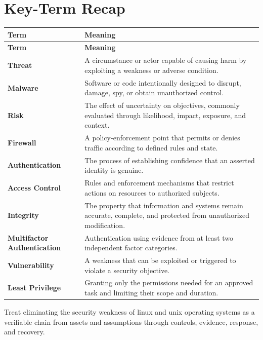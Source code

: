 \documentclass[11pt]{article}
\begin{document}
\section*{Key-Term Recap}
\begin{longtable}{>{\RaggedRight\arraybackslash}p{}>{\RaggedRight\arraybackslash}p{}}
\toprule\rowcolor{Navy}\color{white}\textbf{Term} & \color{white}\textbf{Meaning}\\\midrule
\endfirsthead
\toprule\rowcolor{Navy}\color{white}\textbf{Term} & \color{white}\textbf{Meaning}\\\midrule
\endhead
\textbf{Threat} & A circumstance or actor capable of causing harm by exploiting a weakness or adverse condition. \\\midrule
\textbf{Malware} & Software or code intentionally designed to disrupt, damage, spy, or obtain unauthorized control. \\\midrule
\textbf{Risk} & The effect of uncertainty on objectives, commonly evaluated through likelihood, impact, exposure, and context. \\\midrule
\textbf{Firewall} & A policy-enforcement point that permits or denies traffic according to defined rules and state. \\\midrule
\textbf{Authentication} & The process of establishing confidence that an asserted identity is genuine. \\\midrule
\textbf{Access Control} & Rules and enforcement mechanisms that restrict actions on resources to authorized subjects. \\\midrule
\textbf{Integrity} & The property that information and systems remain accurate, complete, and protected from unauthorized modification. \\\midrule
\textbf{Multifactor Authentication} & Authentication using evidence from at least two independent factor categories. \\\midrule
\textbf{Vulnerability} & A weakness that can be exploited or triggered to violate a security objective. \\\midrule
\textbf{Least Privilege} & Granting only the permissions needed for an approved task and limiting their scope and duration. \\\midrule
\bottomrule
\end{longtable}
\begin{takeawaybox}
Treat eliminating the security weakness of linux and unix operating systems as a verifiable chain from assets and assumptions through controls, evidence, response, and recovery.
\end{takeawaybox}
\end{document}
